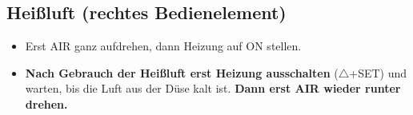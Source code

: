 \documentclass[a4paper]{article}
\begin{document}
\subsection{Heißluft (rechtes Bedienelement)}
\begin{itemize}
	\item Erst AIR ganz aufdrehen, dann Heizung auf ON stellen.
	\item \textbf{Nach Gebrauch der Heißluft erst Heizung ausschalten} ($\triangle$+SET) und warten, bis die Luft
	aus der Düse kalt ist. \textbf{Dann erst AIR wieder runter drehen.}
\end{itemize}
\end{document}
